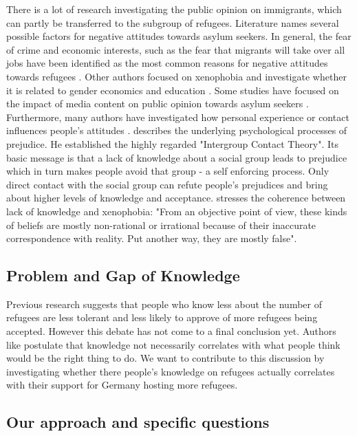 There is a lot of research investigating the public opinion on immigrants, which can partly be transferred to the subgroup of refugees. Literature names several possible factors for negative attitudes towards asylum seekers. In general, the fear of crime and economic interests, such as the fear that migrants will take over all jobs have been identified as the most common reasons for negative attitudes towards refugees \citep{Otto2014}. Other authors focused on xenophobia and investigate whether it is related to gender \citep{Jolly2014} economics and education \citep{Francois2013}. Some studies have focused on the impact of media content on public opinion towards asylum seekers \citep{Boomgaarden2009, Perry1990, Brosius1995}. Furthermore, many authors have investigated how personal experience or contact influences people's attitudes \citep{Pettigrew1997}. \cite{Pettigrew1998} describes the underlying psychological processes of prejudice. He established the highly regarded "Intergroup Contact Theory". Its basic message is that a lack of knowledge about a social group leads to prejudice which in turn makes people avoid that group - a self enforcing process. Only direct contact with the social group can refute people's prejudices and bring about higher levels of knowledge and acceptance. \cite{Rydgren2004} stresses the coherence between lack of knowledge and xenophobia: "From an objective point of view, these kinds of beliefs are mostly non-rational or irrational because of their inaccurate correspondence with reality. Put another way, they are mostly false".

\subsection{Problem and Gap of Knowledge}

Previous research suggests that people who know less about the number of refugees are less tolerant and less likely to approve of more refugees being accepted. However this debate has not come to a final conclusion yet. Authors like \cite{Kahan2014} postulate that knowledge not necessarily correlates with what people think would be the right thing to do. We want to contribute to this discussion by investigating whether there people’s knowledge on refugees actually correlates with their support for Germany hosting more refugees.


\subsection{Our approach and specific questions}

